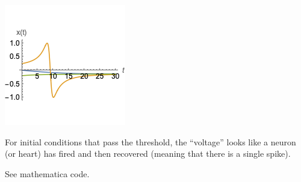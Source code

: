 \documentclass[12pt,letterpaper,noanswers]{exam}
\begin{document}
\begin{questions}
\begin{parts}
\begin{solution}
\includegraphics{img/PS06excite.png}

For initial conditions that pass the threshold, the ``voltage'' looks like a neuron (or heart) has fired and then recovered (meaning that there is a single spike).

See mathematica code.
\end{solution}
\end{parts}






    

   










\end{questions}
\end{document}
